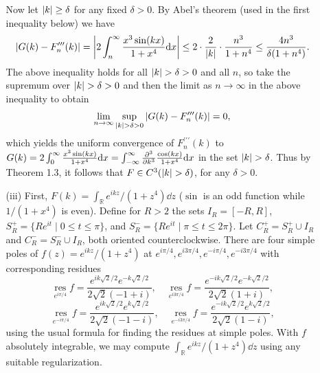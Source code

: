 \documentclass[11pt]{article}
\newcommand{\res}[1]{\operatorname*{res}_{#1}}
\begin{document}
\begin{enumerate}
\begin{enumerate}
        Now let $\abs{k}\geq\delta$ for any fixed $\delta >0$. By Abel's theorem (used in the first inequality below) we have \[\abs{G(k)-F^{\prime\prime\prime}_n(k)} = \abs{2\int_{n}^\infty \frac{x^3\sin(kx)}{1+x^4} \dd x}\leq 2\cdot \frac{2}{\abs{k}}\cdot \frac{n^3}{1+n^4}\leq \frac{4n^3}{\delta(1+n^4)}.\] The above inequality holds for all $\abs{k}>\delta>0$ and all $n$, so take the supremum over $\abs{k}>\delta>0$ and then the limit as $n\to\infty$ in the above inequality to obtain \[\lim_{n\to\infty}\sup_{\abs{k}>\delta>0}\abs{G(k)-F^{\prime\prime\prime}_n(k)} = 0,\] which yields the uniform convergence of $F^{\prime\prime\prime}_n(k)$ to $G(k) = 2\int_0^\infty \frac{x^3\sin(kx)}{1+x^4} \dd x = \int_{-\infty}^\infty \pdv[3]{k}\frac{\cos(kx)}{1+x^4}\dd x$ in the set $\abs{k}>\delta$. Thus by Theorem 1.3, it follows that $F\in C^3(\abs{k}>\delta)$, for any $\delta>0$.
        \item[(iii)] First, $F(k) = \int_{\mathbb{R}}e^{ikz}/(1+z^4)\dd z$ ($\sin$ is an odd function while $1/(1+x^4)$ is even). Define for $R>2$ the sets $I_R = [-R,R]$, $S_R^+ = \{Re^{it}\mid 0\leq t\leq \pi\}$, and $S_R^- = \{Re^{it}\mid \pi\leq t\leq 2\pi\}$. Let $C_R^+ = S_R^+\cup I_R$ and $C_R^- = S_R^-\cup I_R$, both oriented counterclockwise. There are four simple poles of $f(z) = e^{ikz}/(1+z^4)$ at $e^{i\pi/4}, e^{i3\pi/4}, e^{-i\pi/4}, e^{-i3\pi/4}$ with corresponding residues 
        \[\res{e^{i\pi/4}} f = \frac{e^{ik\sqrt{2}/2}e^{-k\sqrt{2}/2}}{2\sqrt{2}(-1+i)}, \quad \res{e^{i3\pi/4}} f = \frac{e^{-ik\sqrt{2}/2}e^{-k\sqrt{2}/2}}{2\sqrt{2}(1+i)},\]
        \[\res{e^{-i\pi/4}} f = \frac{e^{ik\sqrt{2}/2}e^{k\sqrt{2}/2}}{2\sqrt{2}(-1-i)}, \quad \res{e^{-i3\pi/4}} f = \frac{e^{-ik\sqrt{2}/2}e^{k\sqrt{2}/2}}{2\sqrt{2}(1-i)},\] using the usual formula for finding the residues at simple poles. With $f$ absolutely integrable, we may compute $\int_{\mathbb{R}}e^{ikz}/(1+z^4)\dd z$ using any suitable regularization.


\end{enumerate}
\end{enumerate}
\end{document}
